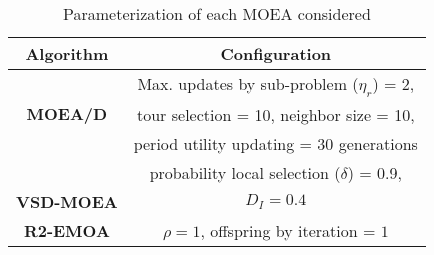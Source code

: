 %
%
%
%
%
%
%

%
\begin{table}[t]
\centering
\caption{Parameterization of each MOEA considered}
\label{tab:Parametrization}
\begin{tabular}{c|c}
\hline
\textbf{Algorithm} & \textbf{Configuration} \\ \hline
\multirow{3}{*}{\textbf{MOEA/D}} &Max. updates by sub-problem ($\eta_r$) = 2, \\
 & tour selection = 10,   neighbor size = 10, \\
 & period utility updating = 30 generations \\ 
 & probability local selection ($\delta$) = 0.9,\\ \hline
\textbf{VSD-MOEA} & $D_I=0.4$ \\ \hline
\textbf{R2-EMOA} & $\rho=1$, offspring by iteration = $1$ \\ \hline
\end{tabular}
\end{table}


